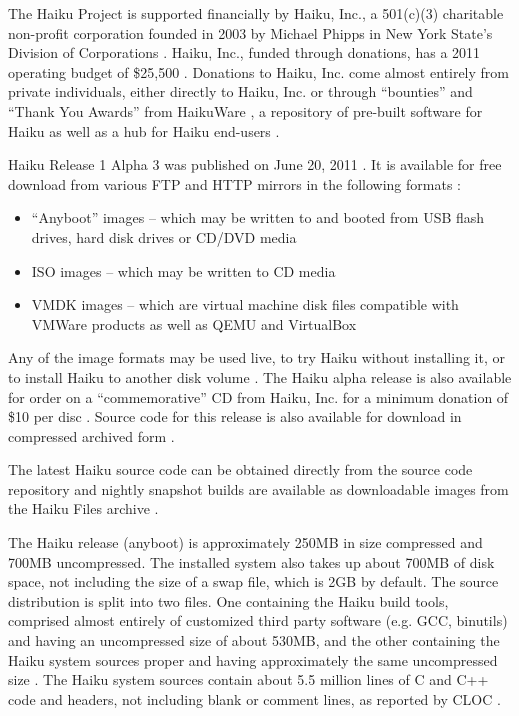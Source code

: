 \documentclass{article}
\begin{document}
The Haiku Project is supported financially by Haiku, Inc., a 501(c)(3)
charitable non-profit corporation founded in 2003 by Michael Phipps in
New York State's Division of Corporations \cite{HaikuIncAbout,
  HaikuInc}.  Haiku, Inc., funded through donations, has a 2011
operating budget of \$25,500 \cite{HaikuIncDocs}.  Donations to Haiku,
Inc. come almost entirely from private individuals, either directly to
Haiku, Inc. or through ``bounties'' and ``Thank You Awards'' from
HaikuWare \cite{HaikuIncDonors, HaikuWareBounties}, a repository of
pre-built software for Haiku as well as a hub for Haiku end-users
\cite{HaikuWareAbout}.

Haiku Release 1 Alpha 3 was published on June 20, 2011
\cite{HaikuRelease}.  It is available for free download from various
FTP and HTTP mirrors in the following formats \cite{HaikuGet}:
\begin{itemize}
\item ``Anyboot'' images -- which may be written to and booted from
  USB flash drives, hard disk drives or CD/DVD media
\item ISO images -- which may be written to CD media
\item VMDK images -- which are virtual machine disk files compatible
  with VMWare products as well as QEMU and VirtualBox \cite{VMDKWiki}
\end{itemize}
Any of the image formats may be used live, to try Haiku without
installing it, or to install Haiku to another disk volume
\cite{HaikuGet}.  The Haiku alpha release is also available for order
on a ``commemorative'' CD from Haiku, Inc. for a minimum donation of
\$10 per disc \cite{HaikuIncOrder}.  Source code for this release is
also available for download in compressed archived form
\cite{HaikuR1A3Src}.

The latest Haiku source code can be obtained directly from the source
code repository \cite{HaikuGetSvn} and nightly snapshot builds are
available as downloadable images from the Haiku Files archive
\cite{HaikuFiles}.

The Haiku release (anyboot) is approximately 250MB in size compressed
\cite{HaikuGet} and 700MB uncompressed.  The installed system also
takes up about 700MB of disk space, not including the size of a swap
file, which is 2GB by default.  The source distribution is split into
two files.  One containing the Haiku build tools, comprised almost
entirely of customized third party software (e.g. GCC, binutils) and
having an uncompressed size of about 530MB, and the other containing
the Haiku system sources proper and having approximately the same
uncompressed size \cite{HaikuR1A3Src}.  The Haiku system sources
contain about 5.5 million lines of C and C++ code and headers, not
including blank or comment lines, as reported by CLOC \cite{Cloc}.
\end{document}
